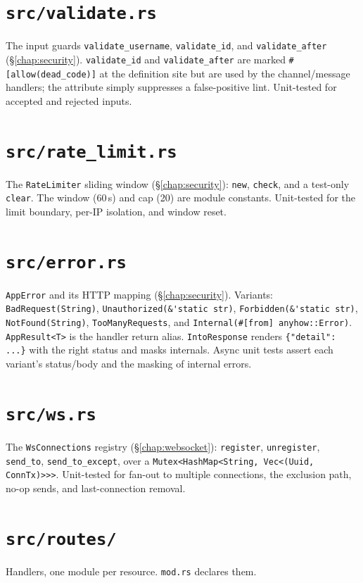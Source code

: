 \section{\texttt{src/validate.rs}}
The input guards \verb|validate_username|, \verb|validate_id|, and
\verb|validate_after| (\S\ref{chap:security}). \verb|validate_id| and
\verb|validate_after| are marked \verb|#[allow(dead_code)]| at the definition
site but are used by the channel/message handlers; the attribute simply suppresses
a false-positive lint. Unit-tested for accepted and rejected inputs.

\section{\texttt{src/rate\_limit.rs}}
The \verb|RateLimiter| sliding window (\S\ref{chap:security}): \verb|new|,
\verb|check|, and a test-only \verb|clear|. The window (60\,s) and cap (20) are
module constants. Unit-tested for the limit boundary, per-IP isolation, and
window reset.

\section{\texttt{src/error.rs}}
\verb|AppError| and its HTTP mapping (\S\ref{chap:security}). Variants:
\verb|BadRequest(String)|, \verb|Unauthorized(&'static str)|,
\verb|Forbidden(&'static str)|, \verb|NotFound(String)|, \verb|TooManyRequests|,
and \verb|Internal(#[from] anyhow::Error)|. \verb|AppResult<T>| is the handler
return alias. \verb|IntoResponse| renders \verb|{"detail": ...}| with the right
status and masks internals. Async unit tests assert each variant's status/body
and the masking of internal errors.

\section{\texttt{src/ws.rs}}
The \verb|WsConnections| registry (\S\ref{chap:websocket}): \verb|register|,
\verb|unregister|, \verb|send_to|, \verb|send_to_except|, over a
\verb|Mutex<HashMap<String, Vec<(Uuid, ConnTx)>>>|. Unit-tested for fan-out to
multiple connections, the exclusion path, no-op sends, and last-connection
removal.

\section{\texttt{src/routes/}}
Handlers, one module per resource. \verb|mod.rs| declares them.

